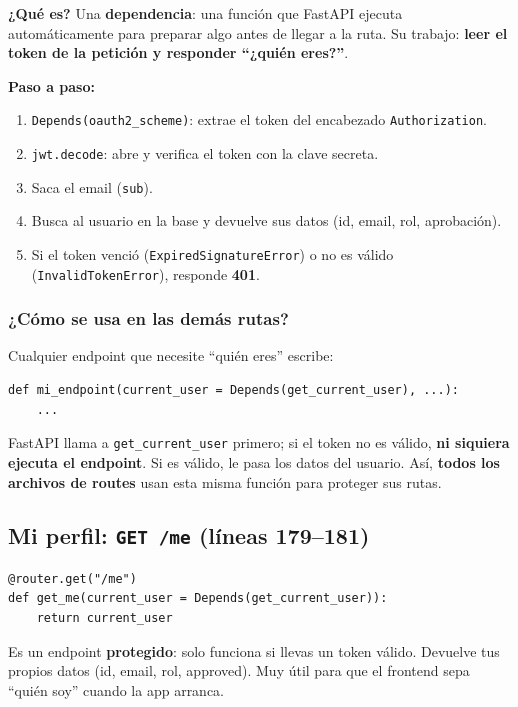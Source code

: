 \documentclass[11pt,a4paper]{article}
\begin{document}
\textbf{¿Qué es?} Una \textbf{dependencia}: una función que FastAPI ejecuta automáticamente
para preparar algo antes de llegar a la ruta. Su trabajo: \textbf{leer el token de la
petición y responder ``¿quién eres?''}.

\textbf{Paso a paso:}
\begin{enumerate}
    \item \texttt{Depends(oauth2\_scheme)}: extrae el token del encabezado \texttt{Authorization}.
    \item \texttt{jwt.decode}: abre y verifica el token con la clave secreta.
    \item Saca el email (\texttt{sub}).
    \item Busca al usuario en la base y devuelve sus datos (id, email, rol, aprobación).
    \item Si el token venció (\texttt{ExpiredSignatureError}) o no es válido
    (\texttt{InvalidTokenError}), responde \textbf{401}.
\end{enumerate}

\subsubsection{¿Cómo se usa en las demás rutas?}

Cualquier endpoint que necesite ``quién eres'' escribe:

\begin{lstlisting}
def mi_endpoint(current_user = Depends(get_current_user), ...):
    ...
\end{lstlisting}

FastAPI llama a \texttt{get\_current\_user} primero; si el token no es válido, \textbf{ni
siquiera ejecuta el endpoint}. Si es válido, le pasa los datos del usuario. Así, \textbf{todos
los archivos de routes} usan esta misma función para proteger sus rutas.

\subsection{Mi perfil: \texttt{GET /me} (líneas 179--181)}

\begin{lstlisting}
@router.get("/me")
def get_me(current_user = Depends(get_current_user)):
    return current_user
\end{lstlisting}

Es un endpoint \textbf{protegido}: solo funciona si llevas un token válido. Devuelve tus
propios datos (id, email, rol, approved). Muy útil para que el frontend sepa ``quién soy''
cuando la app arranca.
\end{document}
